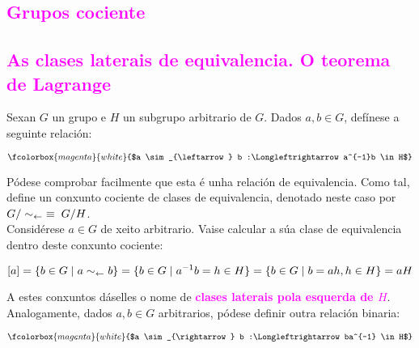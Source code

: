 \documentclass[twoside]{report}
\theoremstyle{mystyle}
\begin{document}
\textcolor{magenta}{\section{Grupos cociente}}

\textcolor{magenta}{\subsection{As clases laterais de equivalencia. O teorema de Lagrange}}

\vspace{3mm}

\noindent Sexan $G$ un grupo e $H$ un subgrupo arbitrario de $G$. Dados $a,b \in G$, defínese a seguinte relación: 

$$\fcolorbox{magenta}{white}{$a \sim_{\leftarrow} b :\Longleftrightarrow a^{-1}b \in H$}$$

\vspace{3mm}

\noindent Pódese comprobar facilmente que esta é unha relación de equivalencia. Como tal, define un conxunto cociente de clases de equivalencia, denotado neste caso por $G/\sim_{\leftarrow} \hspace{1mm} \equiv \hspace{1mm} G/H$. \\

\noindent Considérese $a \in G$ de xeito arbitrario. Vaise calcular a súa clase de equivalencia dentro deste conxunto cociente: 

$$[a] = \{ b \in G \hspace{1MM} | \hspace{1MM} a \sim_{\leftarrow} b \} = \{ b \in G \hspace{1MM} | \hspace{1MM} a^{-1}b = h \in H \} = \{ b \in G \hspace{1MM} | \hspace{1MM} b = ah, h \in H \} = aH$$

\vspace{2mm}

\noindent A estes conxuntos dáselles o nome de \textcolor{magenta}{\textbf{clases laterais pola esquerda de $H$}}.\\

\noindent Analogamente, dados $a,b \in G$ arbitrarios, pódese definir outra relación binaria:

$$\fcolorbox{magenta}{white}{$a \sim_{\rightarrow} b :\Longleftrightarrow ba^{-1} \in H$}$$
\end{document}
